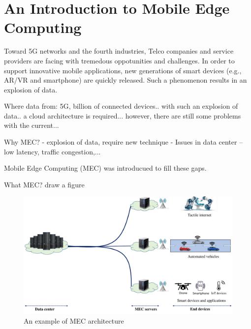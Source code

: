 \section{An Introduction to Mobile Edge Computing}  \label{intro}


Toward 5G networks and the fourth industries, Telco companies and service providers are facing with tremedous oppotunities and challenges. In order to support innovative mobile applications, new generations of smart devices (e.g., AR/VR and smartphone) are quickly released. Such a phenomenon results in an explosion of data. 


Where data from: 5G, billion of connected devices.. with  such an explosion of data.. a cloud architecture is required... however, there are still some problems with the current...


Why MEC? 
  - explosion of data, require new technique
  - Issues in data center -- low latency, traffic congestion,...

Mobile Edge Computing (MEC) was introducued to fill these gaps.

What MEC? draw a figure


\begin{figure}[H]
  \begin{center}
   \includegraphics[width=13cm]{./figures/mec-arch.pdf}
   \caption{An example of MEC architecture}
   \label{fig:mec-arch}
   \end{center}
\end{figure}
